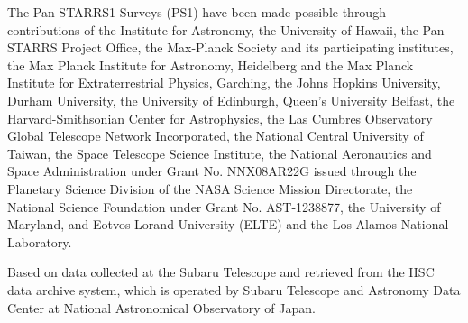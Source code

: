 \documentclass[iop, apj]{emulateapj}
\begin{document}
The Pan-STARRS1 Surveys (PS1) have been made possible through 
 contributions of the Institute for Astronomy, the University of Hawaii, 
 the Pan-STARRS Project Office, the Max-Planck Society and its participating institutes, 
 the Max Planck Institute for Astronomy, Heidelberg and the Max Planck Institute for Extraterrestrial Physics, Garching, 
 the Johns Hopkins University, Durham University, the University of Edinburgh, Queen’s University Belfast, 
 the Harvard-Smithsonian Center for Astrophysics, the Las Cumbres Observatory Global Telescope Network Incorporated, 
 the National Central University of Taiwan, the Space Telescope Science Institute, 
 the National Aeronautics and Space Administration under Grant No. NNX08AR22G issued 
 through the Planetary Science Division of the NASA Science Mission Directorate, 
 the National Science Foundation under Grant No. AST-1238877, the University of Maryland, 
 and Eotvos Lorand University (ELTE) and the Los Alamos National Laboratory.

Based on data collected at the Subaru Telescope and retrieved from the HSC data archive system, 
 which is operated by Subaru Telescope and Astronomy Data Center at National Astronomical Observatory of Japan.
\end{document}
